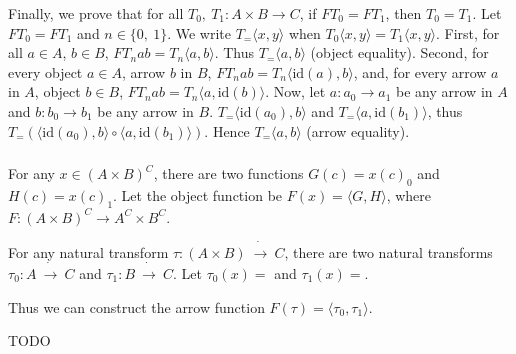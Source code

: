 \documentclass[luatex]{article}
\begin{document}
Finally, we prove that for all $T_0,\ T_1 : A \times B \rightarrow C$, if $FT_0 = FT_1$, then $T_0 = T_1$. Let $FT_0 = FT_1$ and $n \in \{0,\ 1\}$. We write $T_=\langle x, y \rangle$ when $T_0\langle x, y \rangle = T_1\langle x, y \rangle$. First, for all $a \in A$, $b \in B$, $FT_nab = T_n\langle a, b \rangle$. Thus $T_=\langle a, b \rangle$ (object equality). Second, for every object $a \in A$, arrow $b$ in $B$, $FT_nab = T_n\langle \mathrm{id}(a), b \rangle$, and, for every arrow $a$ in $A$, object $b \in B$, $FT_nab = T_n\langle a, \mathrm{id}(b) \rangle$. Now, let $a : a_0 \rightarrow a_1$ be any arrow in $A$ and $b : b_0 \rightarrow b_1$ be any arrow in $B$. $T_=\langle \mathrm{id}(a_0), b \rangle$ and $T_=\langle a, \mathrm{id}(b_1)\rangle$, thus $T_=(\langle \mathrm{id}(a_0), b \rangle \circ \langle a, \mathrm{id}(b_1) \rangle)$. Hence $T_=\langle a, b \rangle$ (arrow equality).

\subsubsection{}

\showArt

For any $x \in (A \times B)^C$, there are two functions $G(c) = x(c)_0$ and $H(c) = x(c)_1$. Let the object function be $F(x) = \langle G, H \rangle$, where $F : (A \times B)^C \rightarrow A^C \times B^C$.

For any natural transform $\tau : (A \times B)\ \dot{\rightarrow}\ C$, there are two natural transforms $\tau_0 : A\ \dot{\rightarrow}\ C$ and $\tau_1 : B\ \dot{\rightarrow}\ C$. Let $\tau_0(x) = $ and $\tau_1(x) = $.

Thus we can construct the arrow function $F(\tau) = \langle \tau_0, \tau_1 \rangle$.

TODO

\subsubsection{}

\subsubsection{}

\subsubsection{}

\subsubsection{}
\end{document}

